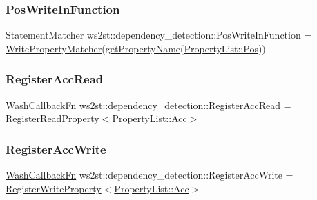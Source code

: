 \subsubsection{\texorpdfstring{Pos\+Write\+In\+Function}{PosWriteInFunction}}
{\footnotesize\ttfamily Statement\+Matcher ws2st\+::dependency\+\_\+detection\+::\+Pos\+Write\+In\+Function = \mbox{\hyperlink{namespacews2st_1_1dependency__detection_a0d8350273a214bbd4586dedadf37ab83}{Write\+Property\+Matcher}}(\mbox{\hyperlink{namespacews2st_1_1dependency__detection_aa7715a6e777bd59ab78718644a58b1fa}{get\+Property\+Name}}(\mbox{\hyperlink{namespacews2st_1_1dependency__detection_abcddd986f080a9e5c494edfad3c3faf7afea4e0fe069dc6f6171dd6044abb2365}{Property\+List\+::\+Pos}}))}

\mbox{\label{namespacews2st_1_1dependency__detection_ad7bc023e5478978651dfa4acd9926607}} 
\subsubsection{\texorpdfstring{Register\+Acc\+Read}{RegisterAccRead}}
{\footnotesize\ttfamily \mbox{\hyperlink{namespacews2st_a682dfda40d8282c7e579a7b826a7d861}{Wash\+Callback\+Fn}} ws2st\+::dependency\+\_\+detection\+::\+Register\+Acc\+Read = \mbox{\hyperlink{namespacews2st_1_1dependency__detection_aa071e67a31629c2fff6e3d16a9eed42d}{Register\+Read\+Property}}$<$\mbox{\hyperlink{namespacews2st_1_1dependency__detection_abcddd986f080a9e5c494edfad3c3faf7a2e02ea7283618d93898c1342e8361dfa}{Property\+List\+::\+Acc}}$>$}

\mbox{\label{namespacews2st_1_1dependency__detection_aacce93ec7d1f29be592d92b73c315501}} 
\subsubsection{\texorpdfstring{Register\+Acc\+Write}{RegisterAccWrite}}
{\footnotesize\ttfamily \mbox{\hyperlink{namespacews2st_a682dfda40d8282c7e579a7b826a7d861}{Wash\+Callback\+Fn}} ws2st\+::dependency\+\_\+detection\+::\+Register\+Acc\+Write = \mbox{\hyperlink{namespacews2st_1_1dependency__detection_a37100c3e1b7e8038aff533d343905484}{Register\+Write\+Property}}$<$\mbox{\hyperlink{namespacews2st_1_1dependency__detection_abcddd986f080a9e5c494edfad3c3faf7a2e02ea7283618d93898c1342e8361dfa}{Property\+List\+::\+Acc}}$>$}

